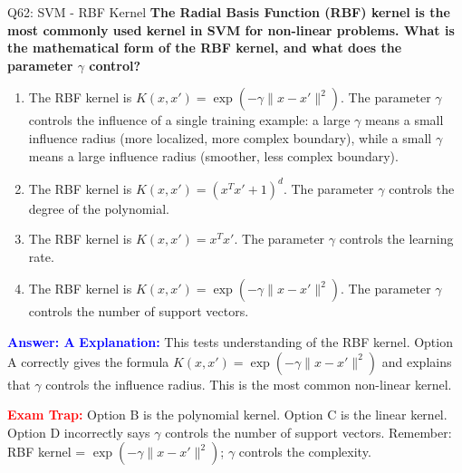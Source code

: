 \documentclass[8pt]{beamer}
\begin{document}
	\begin{frame}{Q62: SVM - RBF Kernel}
		\fontsize{6.5}{7.5}\selectfont
		\textbf{The Radial Basis Function (RBF) kernel is the most commonly used kernel in SVM for non-linear problems. What is the mathematical form of the RBF kernel, and what does the parameter $\gamma$ control?}
		
		\begin{enumerate}
			\item The RBF kernel is $K(x, x') = \exp(-\gamma \|x - x'\|^2)$. The parameter $\gamma$ controls the influence of a single training example: a large $\gamma$ means a small influence radius (more localized, more complex boundary), while a small $\gamma$ means a large influence radius (smoother, less complex boundary).
			\item The RBF kernel is $K(x, x') = (x^T x' + 1)^d$. The parameter $\gamma$ controls the degree of the polynomial.
			\item The RBF kernel is $K(x, x') = x^T x'$. The parameter $\gamma$ controls the learning rate.
			\item The RBF kernel is $K(x, x') = \exp(-\gamma \|x - x'\|^2)$. The parameter $\gamma$ controls the number of support vectors.
		\end{enumerate}
		
		\vspace{0.1cm}
		\textcolor{blue}{\textbf{Answer: A}}
		\vspace{0.1cm}
		\textcolor{blue}{\textbf{Explanation:}} This tests understanding of the RBF kernel. Option A correctly gives the formula $K(x, x') = \exp(-\gamma \|x - x'\|^2)$ and explains that $\gamma$ controls the influence radius. This is the most common non-linear kernel.
		
		\textcolor{red}{\textbf{Exam Trap:}} Option B is the polynomial kernel. Option C is the linear kernel. Option D incorrectly says $\gamma$ controls the number of support vectors. Remember: RBF kernel = $\exp(-\gamma\|x-x'\|^2)$; $\gamma$ controls the complexity.
	\end{frame}
	
\end{document}
